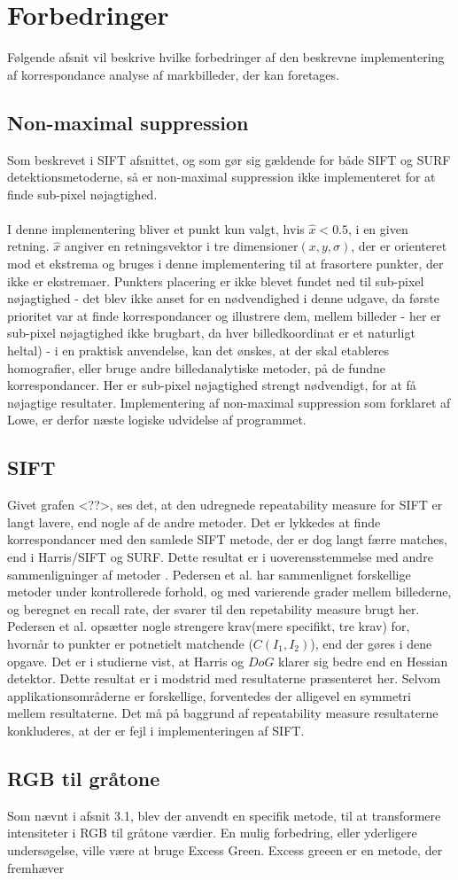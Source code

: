 \section{Forbedringer}
Følgende afsnit vil beskrive hvilke forbedringer af den beskrevne implementering af korrespondance analyse af markbilleder, der kan foretages. 

\subsection{Non-maximal suppression}
Som beskrevet i SIFT afsnittet, og som gør sig gældende for både SIFT og SURF detektionsmetoderne, så er non-maximal suppression ikke implementeret for at finde sub-pixel nøjagtighed. 
\\
\\
I denne implementering bliver et punkt kun valgt, hvis $\hat{x} < 0.5$, i en given retning. $\hat{x}$ angiver en retningsvektor i tre dimensioner$(x, y, \sigma)$, der er orienteret mod et ekstrema og bruges i denne implementering til at frasortere punkter, der ikke er ekstremaer. Punkters placering er ikke blevet fundet ned til sub-pixel nøjagtighed - det blev ikke anset for en nødvendighed i denne udgave, da første prioritet var at finde korrespondancer og illustrere dem, mellem billeder - her er sub-pixel nøjagtighed ikke brugbart, da hver billedkoordinat er et naturligt heltal) - i en praktisk anvendelse, kan det ønskes, at der skal etableres homografier, eller bruge andre billedanalytiske metoder, på de fundne korrespondancer. Her er sub-pixel nøjagtighed strengt nødvendigt, for at få nøjagtige resultater. Implementering af non-maximal suppression som forklaret af Lowe, er derfor næste logiske udvidelse af programmet. 

\subsection{SIFT}
Givet grafen <??>, ses det, at den udregnede repeatability measure for SIFT er langt lavere, end nogle af de andre metoder. Det er lykkedes at finde korrespondancer med den samlede SIFT metode, der er dog langt færre matches, end i Harris/SIFT og SURF. Dette resultat er i uoverensstemmelse med andre sammenligninger af metoder\cite{kim} \cite{kim2}. Pedersen et al. har sammenlignet forskellige metoder under kontrollerede forhold, og med varierende grader mellem billederne, og beregnet en recall rate, der svarer til den repetability measure brugt her. Pedersen et al. opsætter nogle strengere krav(mere specifikt, tre krav) for, hvornår to punkter er potnetielt matchende ($C(I_1, I_2)$), end der gøres i dene opgave. Det er i studierne vist, at Harris og $DoG$ klarer sig bedre end en Hessian detektor. Dette resultat er i modstrid med resultaterne præsenteret her. Selvom applikationsområderne er forskellige, forventedes der alligevel en symmetri mellem resultaterne. Det må på baggrund af repeatability measure resultaterne konkluderes, at der er fejl i implementeringen af SIFT. 

\subsection{RGB til gråtone}
Som nævnt i afsnit 3.1, blev der anvendt en specifik metode, til at transformere intensiteter i RGB til gråtone værdier. En mulig forbedring, eller yderligere undersøgelse, ville være at bruge Excess Green. Excess greeen er en metode, der fremhæver
